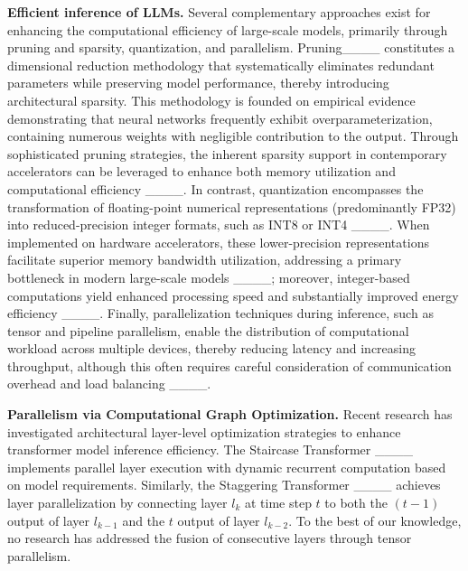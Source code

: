 \begin{figure*}[h!]
{}
\label{fig:matrices}
\end{figure*}


\textbf{Efficient inference of LLMs.} Several complementary approaches exist for enhancing the computational efficiency of large-scale models, primarily through pruning and sparsity, quantization, and parallelism. Pruning____ constitutes a dimensional reduction methodology that systematically eliminates redundant parameters while preserving model performance, thereby introducing architectural sparsity. This methodology is founded on empirical evidence demonstrating that neural networks frequently exhibit overparameterization, containing numerous weights with negligible contribution to the output. Through sophisticated pruning strategies, the inherent sparsity support in contemporary accelerators can be leveraged to enhance both memory utilization and computational efficiency ____. In contrast, quantization encompasses the transformation of floating-point numerical representations (predominantly FP32) into reduced-precision integer formats, such as INT8 or INT4 ____. When implemented on hardware accelerators, these lower-precision representations facilitate superior memory bandwidth utilization, addressing a primary bottleneck in modern large-scale models ____; moreover, integer-based computations yield enhanced processing speed and substantially improved energy efficiency ____. Finally, parallelization techniques during inference, such as tensor and pipeline parallelism, enable the distribution of computational workload across multiple devices, thereby reducing latency and increasing throughput, although this often requires careful consideration of communication overhead and load balancing ____.





\textbf{Parallelism via Computational Graph Optimization.} Recent research has investigated architectural layer-level optimization strategies to enhance transformer model inference efficiency. The Staircase Transformer ____ implements parallel layer execution with dynamic recurrent computation based on model requirements. Similarly, the Staggering Transformer ____ achieves layer parallelization by connecting layer $l_k$ at time step $t$ to both the $(t-1)$ output of layer $l_{k-1}$ and the $t$ output of layer $l_{k-2}$. To the best of our knowledge, no research has addressed the fusion of consecutive layers through tensor parallelism.